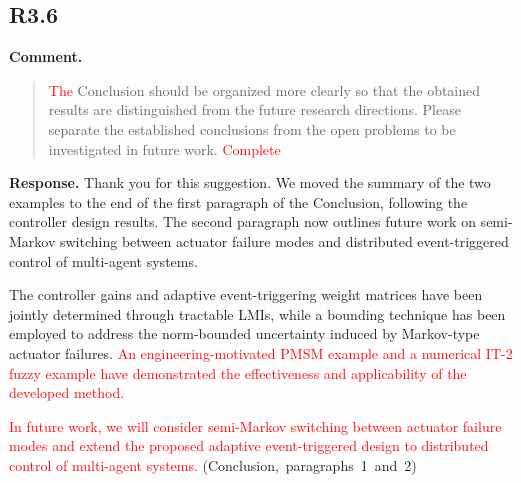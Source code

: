 \documentclass[12pt,a4paper]{article}
\begin{document}
\subsection*{R3.6}

\textbf{Comment.}
\begin{quote}
\raggedright
\textcolor{red}{The} Conclusion should be organized more clearly so that the obtained results are distinguished from the future research directions. Please separate the established conclusions from the open problems to be investigated in future work. \textcolor{red}{Complete}
\end{quote}

\textbf{Response.}
Thank you for this suggestion. We moved the summary of the two examples to the end of the first paragraph of the Conclusion, following the controller design results. The second paragraph now outlines future work on semi-Markov switching between actuator failure modes and distributed event-triggered control of multi-agent systems.

The controller gains and adaptive event-triggering weight matrices have been jointly determined through tractable LMIs, while a bounding technique has been employed to address the norm-bounded uncertainty induced by Markov-type actuator failures. \textcolor{red}{An engineering-motivated PMSM example and a numerical IT-2 fuzzy example have demonstrated the effectiveness and applicability of the developed method.}

\begingroup
{}
\textcolor{red}{In future work, we will consider semi-Markov switching between actuator failure modes and extend the proposed adaptive event-triggered design to distributed control of multi-agent systems.} \mbox{(Conclusion, paragraphs 1 and 2)}\par
\endgroup

%
%
\end{document}
